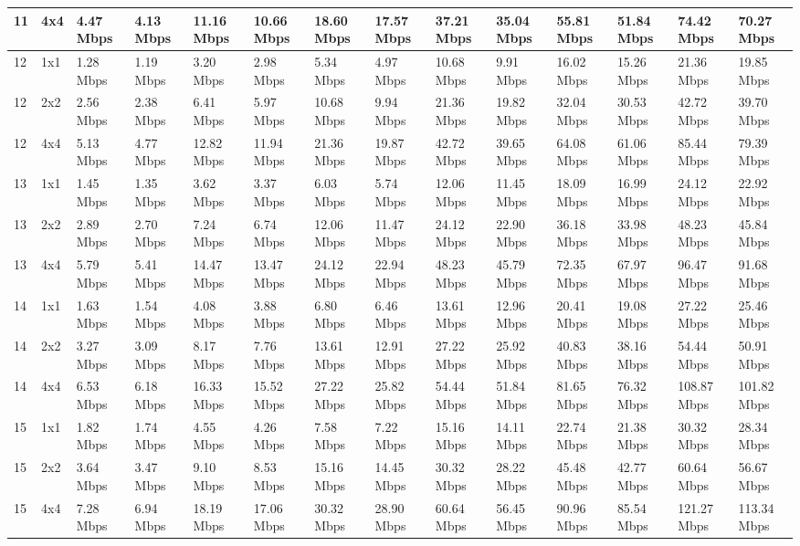 \documentclass[12pt]{article}
\begin{document}
\begin{longtable}[c]{|l|l|l|l|l|l|l|l|l|l|l|l|l|l|}
11 & 4x4 & 4.47 Mbps & 4.13 Mbps & 11.16 Mbps & 10.66 Mbps & 18.60 Mbps & 17.57 Mbps & 37.21 Mbps & 35.04 Mbps & 55.81 Mbps & 51.84 Mbps & 74.42 Mbps & 70.27 Mbps \\ \hline
12 & 1x1 & 1.28 Mbps & 1.19 Mbps & 3.20 Mbps & 2.98 Mbps & 5.34 Mbps & 4.97 Mbps & 10.68 Mbps & 9.91 Mbps & 16.02 Mbps & 15.26 Mbps & 21.36 Mbps & 19.85 Mbps \\ \hline
12 & 2x2 & 2.56 Mbps & 2.38 Mbps & 6.41 Mbps & 5.97 Mbps & 10.68 Mbps & 9.94 Mbps & 21.36 Mbps & 19.82 Mbps & 32.04 Mbps & 30.53 Mbps & 42.72 Mbps & 39.70 Mbps \\ \hline
12 & 4x4 & 5.13 Mbps & 4.77 Mbps & 12.82 Mbps & 11.94 Mbps & 21.36 Mbps & 19.87 Mbps & 42.72 Mbps & 39.65 Mbps & 64.08 Mbps & 61.06 Mbps & 85.44 Mbps & 79.39 Mbps \\ \hline
13 & 1x1 & 1.45 Mbps & 1.35 Mbps & 3.62 Mbps & 3.37 Mbps & 6.03 Mbps & 5.74 Mbps & 12.06 Mbps & 11.45 Mbps & 18.09 Mbps & 16.99 Mbps & 24.12 Mbps & 22.92 Mbps \\ \hline
13 & 2x2 & 2.89 Mbps & 2.70 Mbps & 7.24 Mbps & 6.74 Mbps & 12.06 Mbps & 11.47 Mbps & 24.12 Mbps & 22.90 Mbps & 36.18 Mbps & 33.98 Mbps & 48.23 Mbps & 45.84 Mbps \\ \hline
13 & 4x4 & 5.79 Mbps & 5.41 Mbps & 14.47 Mbps & 13.47 Mbps & 24.12 Mbps & 22.94 Mbps & 48.23 Mbps & 45.79 Mbps & 72.35 Mbps & 67.97 Mbps & 96.47 Mbps & 91.68 Mbps \\ \hline
14 & 1x1 & 1.63 Mbps & 1.54 Mbps & 4.08 Mbps & 3.88 Mbps & 6.80 Mbps & 6.46 Mbps & 13.61 Mbps & 12.96 Mbps & 20.41 Mbps & 19.08 Mbps & 27.22 Mbps & 25.46 Mbps \\ \hline
14 & 2x2 & 3.27 Mbps & 3.09 Mbps & 8.17 Mbps & 7.76 Mbps & 13.61 Mbps & 12.91 Mbps & 27.22 Mbps & 25.92 Mbps & 40.83 Mbps & 38.16 Mbps & 54.44 Mbps & 50.91 Mbps \\ \hline
14 & 4x4 & 6.53 Mbps & 6.18 Mbps & 16.33 Mbps & 15.52 Mbps & 27.22 Mbps & 25.82 Mbps & 54.44 Mbps & 51.84 Mbps & 81.65 Mbps & 76.32 Mbps & 108.87 Mbps & 101.82 Mbps \\ \hline
15 & 1x1 & 1.82 Mbps & 1.74 Mbps & 4.55 Mbps & 4.26 Mbps & 7.58 Mbps & 7.22 Mbps & 15.16 Mbps & 14.11 Mbps & 22.74 Mbps & 21.38 Mbps & 30.32 Mbps & 28.34 Mbps \\ \hline
15 & 2x2 & 3.64 Mbps & 3.47 Mbps & 9.10 Mbps & 8.53 Mbps & 15.16 Mbps & 14.45 Mbps & 30.32 Mbps & 28.22 Mbps & 45.48 Mbps & 42.77 Mbps & 60.64 Mbps & 56.67 Mbps \\ \hline
15 & 4x4 & 7.28 Mbps & 6.94 Mbps & 18.19 Mbps & 17.06 Mbps & 30.32 Mbps & 28.90 Mbps & 60.64 Mbps & 56.45 Mbps & 90.96 Mbps & 85.54 Mbps & 121.27 Mbps & 113.34 Mbps \\ \hline

\end{longtable}
\end{document}
